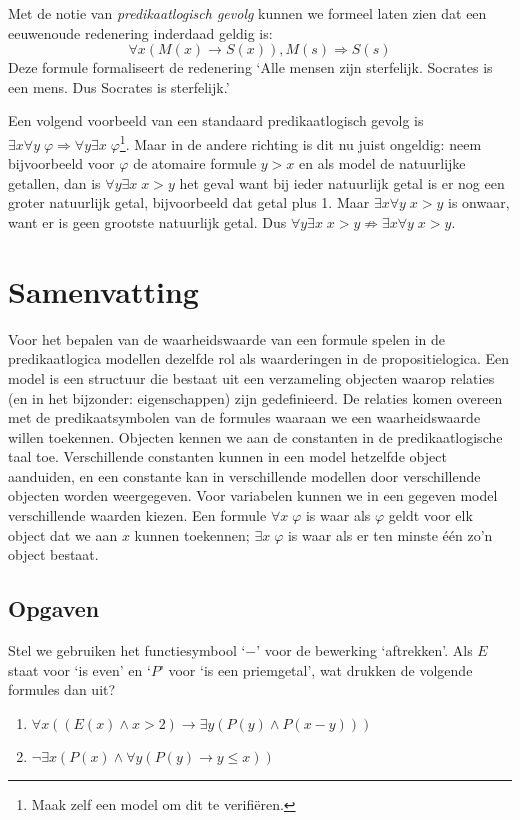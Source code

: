  Met de notie van \textit{predikaatlogisch gevolg} kunnen we formeel laten zien dat een eeuwenoude redenering inderdaad geldig is:
 $$\forall x(M(x)\rightarrow S(x)), M(s)\Rightarrow S(s)$$
 Deze formule formaliseert de redenering `Alle mensen zijn sterfelijk. Socrates is een mens. Dus Socrates is sterfelijk.'
 
 Een volgend voorbeeld van een standaard predikaatlogisch gevolg  is $\exists x\forall y\;\varphi\Rightarrow\forall y\exists x\;\varphi$\footnote{Maak zelf een model om dit te verifi\"eren.}. Maar in de andere richting is dit nu juist ongeldig: neem bijvoorbeeld voor $\varphi$ de atomaire formule $y>x$ en als model de natuurlijke getallen, dan is $\forall y\exists x\;x>y$ het geval want bij ieder natuurlijk getal is er nog een groter natuurlijk getal, bijvoorbeeld dat getal plus 1. Maar $\exists x\forall y\;x>y$ is onwaar, want er is geen grootste natuurlijk getal. Dus $\forall y\exists x\;x>y\not\Rightarrow\exists x\forall y\;x>y$.
 
 \section{Samenvatting}
 Voor het bepalen van de waarheidswaarde van een formule spelen in de predikaatlogica modellen dezelfde rol als waarderingen in de propositielogica. Een model is een structuur die bestaat uit een verzameling objecten waarop relaties (en in het bijzonder: eigenschappen) zijn gedefinieerd. De relaties komen overeen met de predikaatsymbolen van de formules waaraan we een waarheidswaarde willen toekennen. Objecten kennen we aan de constanten in de predikaatlogische taal toe. Verschillende constanten kunnen in een model hetzelfde object aanduiden, en een constante kan in verschillende modellen door verschillende objecten worden weergegeven. Voor variabelen kunnen we in een gegeven model verschillende waarden kiezen. Een formule $\forall x\;\varphi$ is waar als $\varphi$ geldt voor elk object dat we aan $x$ kunnen toekennen; $\exists x\;\varphi$ is waar als er ten minste \'e\'en zo'n object bestaat.
 
 \subsection{Opgaven}
 \begin{exercise}
 Stel we gebruiken het functiesymbool `$-$' voor de bewerking `aftrekken'. Als $E$ staat voor `is even' en `$P$' voor `is een priemgetal', wat drukken de volgende formules dan uit?
 \begin{enumerate}
     \item $\forall x((E(x)\wedge x>2)\rightarrow\exists y(P(y)\wedge P(x-y)))$
     \item $\neg\exists x(P(x)\wedge\forall y(P(y)\rightarrow y\leq x))$
 \end{enumerate}
 \end{exercise}
 
